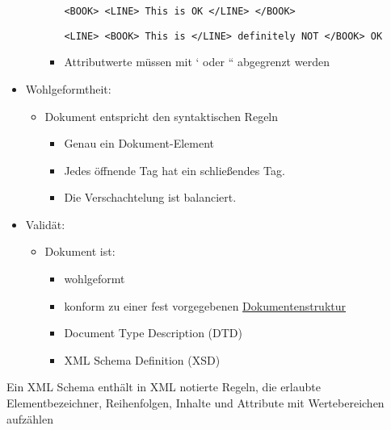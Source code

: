 \begin{itemize}
\begin{itemize}
\begin{itemize}
            \lstset{language=XML, breaklines=true}
            \begin{lstlisting}[label={lst:lstlisting5}]
                <BOOK> <LINE> This is OK </LINE> </BOOK>
            \end{lstlisting}
            \lstset{language=XML, breaklines=true}
            \begin{lstlisting}[label={lst:lstlisting6}]
                <LINE> <BOOK> This is </LINE> definitely NOT </BOOK> OK
            \end{lstlisting}
            \item Attributwerte müssen mit ‘ oder “ abgegrenzt werden
        \end{itemize}
    \end{itemize}
\end{itemize}

\begin{itemize}
    \item Wohlgeformtheit:
    \begin{itemize}
        \item Dokument entspricht den syntaktischen Regeln
        \begin{itemize}
            \item Genau ein Dokument-Element
            \item Jedes öffnende Tag hat ein schließendes Tag.
            \item Die Verschachtelung ist balanciert.
        \end{itemize}
    \end{itemize}
    \item Validät:
    \begin{itemize}
        \item Dokument ist:
        \begin{itemize}
            \item wohlgeformt
            \item konform zu einer fest vorgegebenen \underline{Dokumentenstruktur}
            \item Document Type Description (DTD)
            \item XML Schema Definition (XSD)
        \end{itemize}
    \end{itemize}
\end{itemize}

Ein XML Schema enthält in XML notierte Regeln, die erlaubte Elementbezeichner, Reihenfolgen, Inhalte und Attribute mit Wertebereichen aufzählen

